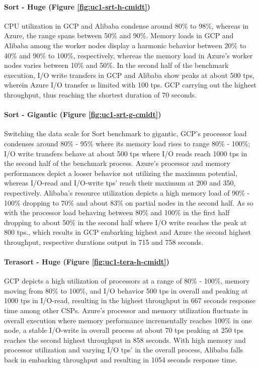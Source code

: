 \documentclass[review]{elsarticle}
\begin{document}
\paragraph{Sort - Huge (Figure \ref{fig:uc1-srt-h-cmidt})}CPU utilization in GCP and Alibaba condense around 80\% to 98\%, whereas in Azure, the range spans between 50\% and 90\%. Memory loads in GCP and Alibaba among the worker nodes display a harmonic behavior between 20\% to 40\% and 90\% to 100\%, respectively, whereas the memory load in Azure's worker nodes varies between 10\% and 50\%. In the second half of the benchmark execution, I/O write transfers in GCP and Alibaba show peaks at about 500 tps, wherein Azure I/O transfer ıs limited with 100 tps. GCP carrying out the highest throughput, thus reaching the shortest duration of 70 seconds.

\paragraph{Sort - Gigantic (Figure \ref{fig:uc1-srt-g-cmidt})}Switching the data scale for Sort benchmark to gigantic, GCP's processor load condenses around 80\% - 95\% where its memory load rises to range 80\% - 100\%; I/O write transfers behave at about 500 tps where I/O reads reach 1000 tps in the second half of the benchmark process. Azure's processor and memory performances depict a looser behavior not utilizing the maximum potential, whereas I/O-read and I/O-write tps' reach their maximum at 200 and 350, respectively. Alibaba's resource utilization depicts a high memory load of 90\% - 100\% dropping to 70\% and about 83\% on partial nodes in the second half. As so with the processor load behaving between 80\% and 100\% in the first half dropping to about 50\% in the second half where I/O write reaches the peak at 800 tps., which results in GCP embarking highest and Azure the second highest throughput, respective durations output in 715 and 758 seconds.

\paragraph{Terasort - Huge (Figure \ref{fig:uc1-tera-h-cmidt})}GCP depicts a high utilization of processors at a range of 80\% - 100\%, memory moving from 80\% to 100\%, and I/O behavior 500 tps in overall and peaking at 1000 tps in I/O-read, resulting in the highest throughput in 667 seconds response time among other CSPs. Azure's processor and memory utilization fluctuate in overall execution where memory performance incrementally reaches 100\% in one node, a stable I/O-write in overall process at about 70 tps peaking at 250 tps reaches the second highest throughput in 858 seconds. With high memory and processor utilization and varying I/O tps' in the overall process, Alibaba falls back in embarking throughput and resulting in 1054 seconds response time.
\end{document}
